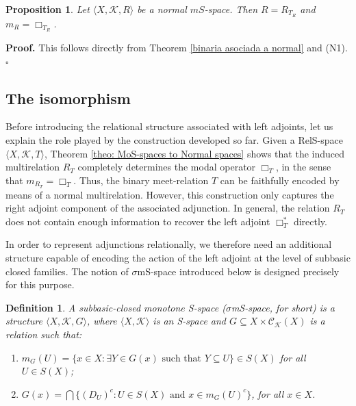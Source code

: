 \documentclass{article}
\newtheorem{definition}{\bf Definition}[section]
\newtheorem{proposition}{\bf Proposition}[section]
\newenvironment{proof}
{\par\noindent\textbf{Proof. }\rm}
{\hfill$\boldsymbol{\square}$\par\vspace{0.3cm}}
\begin{document}
\begin{proposition}\label{R=R_T_R}   
Let $\langle X, \mathcal{K}, R \rangle$ be a normal $mS$-space. Then $R=R_{T_R}$ and $m_{R}=\Box_{T_R}$.
\end{proposition} 

\begin{proof}
This follows directly from Theorem \ref{binaria asociada a normal} and (N1).
\end{proof}


\subsection{The isomorphism}\label{the isomorphism of categories}


Before introducing the relational structure associated with left adjoints, let us explain the role played by the construction developed so far.  Given a RelS-space $\langle X,\mathcal{K},T\rangle$, Theorem \ref{theo: MoS-spaces to Normal spaces} shows that the induced multirelation $R_T$ completely determines the modal operator $\Box_T$, in the sense that $m_{R_T}=\Box_T$. Thus, the binary meet-relation $T$ can be faithfully encoded by means of a normal multirelation. However, this construction only captures the right adjoint component of the associated adjunction. In general, the relation $R_T$ does not contain enough information to recover the left adjoint $\Box_T^{*}$ directly.

In order to represent adjunctions relationally, we therefore need an additional structure capable of encoding the action of the left adjoint at the level of subbasic closed families. The notion of $\sigma$mS-space introduced below is designed precisely for this purpose.

\begin{definition}\label{definicion sigmaSP}
A subbasic-closed monotone S-space  ($\sigma$mS-space, for short) is a structure $\langle X, \mathcal{K}, G \rangle$, where $\langle X, \mathcal{K}\rangle$ is an \textit{S-space} and $G \subseteq X \times \mathcal{C}_{{\mathcal{K}}}(X)$ is a relation such that:

\begin{enumerate}
    \item $m_G(U) = \{ x \in X \colon  \exists Y \in G(x) \text{ such that } Y \subseteq U \} \in S(X)$ for all $U \in S(X)$;
    \item $G(x) = \bigcap\{ (D_U)^{c} \colon U \in S(X) \text{ and } x \in m_G(U)^{c} \}$, for all $x \in X$.
\end{enumerate}
\end{definition}
\end{document}

